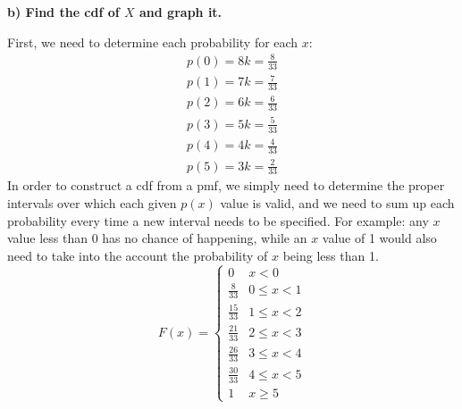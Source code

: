 \documentclass[12pt, letter]{article}
\begin{document}
\qquad \textbf{b) Find the cdf of $X$ and graph it.}
\begin{center}
	First, we need to determine each probability for each $x$:
	\begin{align*}
		p(0) = 8k = \frac{8}{33} \\
		p(1) = 7k = \frac{7}{33} \\
		p(2) = 6k = \frac{6}{33} \\
		p(3) = 5k = \frac{5}{33} \\
		p(4) = 4k = \frac{4}{33} \\
		p(5) = 3k = \frac{2}{33}
	\end{align*}
	In order to construct a cdf from a pmf, we simply need to determine the proper intervals over which each given $p(x)$ value is valid, and we need to sum up each probability every time a new interval needs to be specified. For example: any $x$ value less than 0 has no chance of happening, while an $x$ value of 1 would also need to take into the account the probability of $x$ being less than 1.
	\def\arraystretch{1.2}
	\[
    F(x) = \left\{\begin{array}{cc}
        0 & x < 0 \\
        \frac{8}{33} & 0 \le x < 1 \\
        \frac{15}{33} & 1 \le x < 2 \\
        \frac{21}{33} & 2 \le x < 3 \\
        \frac{26}{33} & 3 \le x < 4 \\
        \frac{30}{33} & 4 \le x < 5 \\
        1 & x \ge 5 
        \end{array}\right.
	\]
\end{center}

\pagebreak

{\centering
{}
\par}
\end{document}
